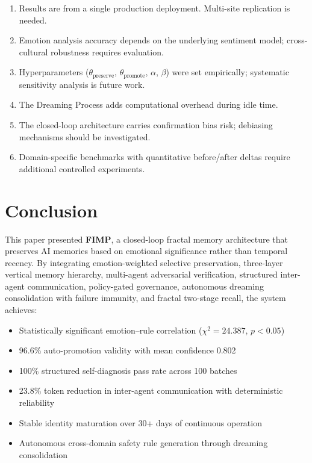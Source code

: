 \documentclass[11pt,a4paper]{article}
\begin{document}
\begin{enumerate}[leftmargin=*, itemsep=3pt]
  \item Results are from a single production deployment. Multi-site replication is needed.
  \item Emotion analysis accuracy depends on the underlying sentiment model; cross-cultural
        robustness requires evaluation.
  \item Hyperparameters ($\theta_{\text{preserve}}$, $\theta_{\text{promote}}$, $\alpha$,
        $\beta$) were set empirically; systematic sensitivity analysis is future work.
  \item The Dreaming Process adds computational overhead during idle time.
  \item The closed-loop architecture carries confirmation bias risk; debiasing mechanisms
        should be investigated.
  \item Domain-specific benchmarks with quantitative before/after deltas require additional
        controlled experiments.
\end{enumerate}

\section{Conclusion}

This paper presented \textbf{FIMP}, a closed-loop fractal memory architecture that preserves
AI memories based on emotional significance rather than temporal recency. By integrating
emotion-weighted selective preservation, three-layer vertical memory hierarchy, multi-agent
adversarial verification, structured inter-agent communication, policy-gated governance,
autonomous dreaming consolidation with failure immunity, and fractal two-stage recall, the
system achieves:

\begin{itemize}[itemsep=2pt]
  \item Statistically significant emotion--rule correlation
        ($\chi^2 = 24.387$, $p < 0.05$)
  \item 96.6\% auto-promotion validity with mean confidence 0.802
  \item 100\% structured self-diagnosis pass rate across 100 batches
  \item 23.8\% token reduction in inter-agent communication with deterministic reliability
  \item Stable identity maturation over 30+ days of continuous operation
  \item Autonomous cross-domain safety rule generation through dreaming consolidation
\end{itemize}
\end{document}
